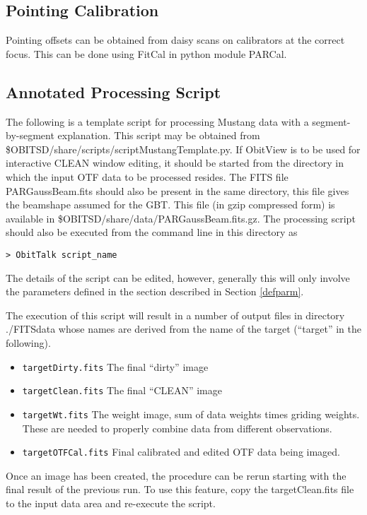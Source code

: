 \documentclass[11pt]{report}
\begin{document}
\subsection{Pointing Calibration}
Pointing offsets can be obtained from daisy scans on calibrators at
the correct focus.
This can be done using FitCal in python module PARCal.

\subsection{Annotated Processing Script}
The following is a template script for processing Mustang data with a
segment-by-segment explanation.
This script may be obtained from \$OBITSD/share/scripts/scriptMustangTemplate.py.
If ObitView is to be used for interactive CLEAN window editing, it
should be started from the directory in which the input OTF data to be
processed resides.
The  FITS file PARGaussBeam.fits should also be present in the same
directory, this file gives the beamshape assumed for the GBT.
This file (in gzip compressed form) is available in
\$OBITSD/share/data/PARGaussBeam.fits.gz. 
The processing script should also be executed from the command line in
this directory as
\begin{verbatim}
> ObitTalk script_name
\end{verbatim}
The details of the script can be edited, however, generally this will
only involve the parameters defined in the section described in
Section \ref{defparm}.

The execution of this script will result in a number of output files
in directory ./FITSdata whose names are derived from the name of the
target (``target'' in the following).
\begin{itemize}
\item {\tt targetDirty.fits} The final ``dirty'' image
\item {\tt targetClean.fits} The final ``CLEAN'' image
\item {\tt targetWt.fits} The weight image, sum of data weights times
griding weights.
These are needed to properly combine data from different observations.
\item {\tt targetOTFCal.fits} Final calibrated and edited OTF data 
being imaged.
\end{itemize}

Once an image has been created, the procedure can be rerun starting
with the final result of the previous run.
To use this feature, copy the targetClean.fits file to the input data
area and re-execute the script.
\end{document}
